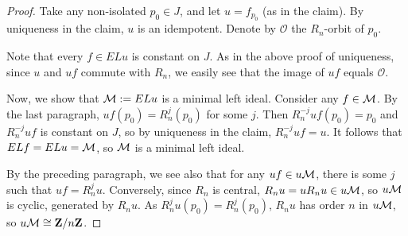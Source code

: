 \begin{proof}
		Take any non-isolated $p_0\in J$, and let $u=f_{p_0}$ (as in the claim). By uniqueness in the claim, $u$ is an idempotent. Denote by $\mathcal O$ the $R_n$-orbit of $p_0$.
		
		Note that every $f \in ELu$ is constant on $J$. As in the above proof of uniqueness, since $u$ and $uf$ commute with $R_n$, we easily see that the image of $uf$ equals $\mathcal O$.
		
		Now, we show that ${\mathcal M}:=ELu$ is a minimal left ideal. Consider any $f \in {\mathcal M}$.
		By the last paragraph, $uf(p_0)=R_n^j(p_0)$ for some $j$. Then $R_n^{-j}uf(p_0)=p_0$ and $R_n^{-j}uf$ is constant on $J$, so by uniqueness in the claim, $R_n^{-j}uf=u$. It follows that $ELf=ELu={\mathcal M}$, so ${\mathcal M}$ is a minimal left ideal.
		
		
		By the preceding paragraph, we see also that for any $uf\in u{\mathcal M}$, there is some $j$ such that $uf=R_n^ju$. Conversely, since $R_n$ is central, $R_nu=uR_nu\in u{\mathcal M}$, so $u{\mathcal M}$ is cyclic, generated by $R_nu$. As $R_n^ju(p_0)=R_n^j(p_0)$, $R_nu$ has order $n$ in $u{\mathcal M}$, so $u{\mathcal M}\cong {\mathbf{Z}}/n{\mathbf{Z}}$.
	\end{proof}
	
